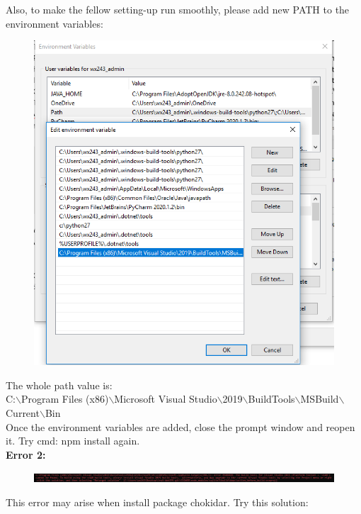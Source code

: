 \documentclass{article}
\begin{document}
\begin{enumerate}
\begin{figure}[h!]
    \label{fig:vctargetspath}
    \end{figure}
  \FloatBarrier  
  Also, to make the fellow setting-up run smoothly, please add new PATH to the environment variables: 
  \FloatBarrier
    \begin{figure}[h!]
    \centering
    \includegraphics[scale=0.8]{path.png}
    \label{fig:path}
    \end{figure}
  \FloatBarrier 
  The whole path value is:\\ C:$\backslash$Program Files (x86)$\backslash$Microsoft Visual Studio$\backslash$2019$\backslash$BuildTools$\backslash$MSBuild$\backslash$Current$\backslash$Bin
  \\
  Once the environment variables are added, close the prompt window and reopen it. Try cmd: npm install again.\\
 \textbf{Error 2:}
  \FloatBarrier
    \begin{figure}[h!]
    \centering
    \includegraphics[scale=0.4]{error2.png}
    \label{fig:error2}
    \end{figure}
  \FloatBarrier  
 This error may arise when install package chokidar. Try this solution:\\

\end{enumerate}
\end{document}
